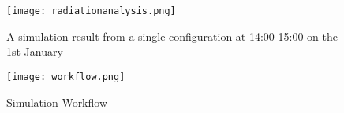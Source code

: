 

\begin{figure}
\begin{center}
\texttt{[image: radiationanalysis.png]}
\caption{A simulation result from a single configuration at 14:00-15:00 on the 1st January}
\label{fig:radiation}
\end{center}
\end{figure}


\begin{figure}
\begin{center}
\texttt{[image: workflow.png]}
\caption{Simulation Workflow}
\label{fig:workflow}
\end{center}
\end{figure}